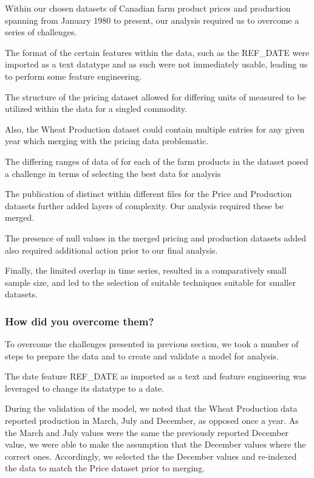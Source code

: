 Within our chosen datasets of Canadian farm product prices and production spanning from January 1980 to present, our analysis required us to overcome a series of challenges. 

The format of the certain features within the data, such as the REF\_DATE were imported as a text datatype and as such were not immediately usable, leading us to perform some feature engineering.

The structure of the pricing dataset allowed for differing units of measured to be utilized within the data for a singled commodity. 

Also, the Wheat Production dataset could contain multiple entries for any given year which merging with the pricing data problematic. 

The differing ranges of data of for each of the farm products in the dataset posed a challenge in terms of selecting the best data for analysis  

The publication of distinct within different files for the Price and Production datasets further added layers of complexity. Our analysis required these be merged.

The presence of null values in the merged pricing and production datasets added also required additional action prior to our final analysis. 

Finally, the limited overlap in time series, resulted in a comparatively small sample size, and led to the selection of suitable techniques suitable for smaller datasets. 

\subsubsection{How did you overcome them?}

To overcome the challenges presented in previous section, we took a number of steps to prepare the data and to create and validate a model for analysis.  

The date feature REF\_DATE as imported as a text and feature engineering was leveraged to change its datatype to a date.

During the validation of the model, we noted that the Wheat Production data reported production in March, July and December, as opposed once a year. As the March and July values were the same the previously reported December value, we were able to make the assumption that the December values where the correct ones. Accordingly, we selected the the December values and re-indexed the data to match the Price dataset prior to merging.

